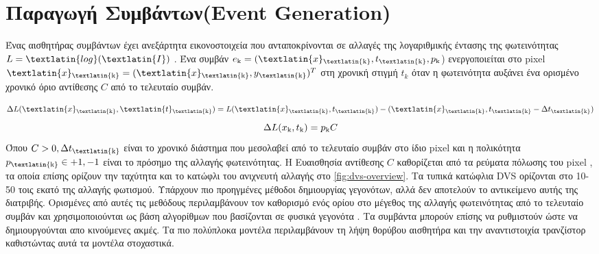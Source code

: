 \documentclass[12pt]{report}
\begin{document}
\section{Παραγωγή Συμβάντων(\textlatin{Event Generation})}

Ένας αισθητήρας συμβάντων \cite{Lichtsteiner2008} έχει ανεξάρτητα εικονοστοιχεία που ανταποκρίνονται
σε αλλαγές της λογαριθμικής έντασης της φωτεινότητας $L=\textlatin{log}(\textlatin{I})$ . Ένα συμβάν $e\textsubscript{k}=(\textlatin{x}\textsubscript{\textlatin{k}},t\textsubscript{\textlatin{k}},p\textsubscript{k}$) ενεργοποιείται στο \textlatin{pixel} $\textlatin{x}\textsubscript{\textlatin{k}}=(\textlatin{x}\textsubscript{\textlatin{k}},y\textsubscript{\textlatin{k}})^T$ στη χρονική στιγμή $t_k$ όταν η φωτεινότητα αυξάνει ένα ορισμένο χρονικό όριο αντίθεσης $C$ από το τελευταίο συμβάν.

\begin{equation}
    \Delta L(\textlatin{x}\textsubscript{\textlatin{k}},\textlatin{t}\textsubscript{\textlatin{k}}) = L(\textlatin{x}\textsubscript{\textlatin{k}},t\textsubscript{\textlatin{k}})-(\textlatin{x}\textsubscript{\textlatin{k}},t\textsubscript{\textlatin{k}}-\Delta t\textsubscript{\textlatin{k}})
\end{equation}
\begin{equation}
   \Delta L(x\textsubscript{k},t\textsubscript{k}) = p\textsubscript{k}C 
\end{equation}
Όπου \(C > 0, \Delta t\textsubscript{\textlatin{k}}\) είναι το χρονικό διάστημα που μεσολαβεί από το τελευταίο συμβάν στο ίδιο \textlatin{pixel} και η πολικότητα \(p\textsubscript{\textlatin{k}} \in {+1,-1}\) είναι το πρόσημο της αλλαγής φωτεινότητας\cite{Lichtsteiner2008}. Η Ευαισθησία αντίθεσης $C$ καθορίζεται από τα ρεύματα πόλωσης του \textlatin{pixel} \cite{nozaki2017} \cite{Gallego2020}, τα οποία επίσης ορίζουν την ταχύτητα και το κατώφλι του ανιχνευτή αλλαγής στο \ref{fig:dvs-overview}. Τα τυπικά κατώφλια \textlatin{DVS} ορίζονται στο 10-50 τοις εκατό της αλλαγής φωτισμού. Υπάρχουν πιο προηγμένες μέθοδοι δημιουργίας γεγονότων, αλλά δεν αποτελούν το αντικείμενο αυτής της διατριβής. Ορισμένες από αυτές τις μεθόδους περιλαμβάνουν τον καθορισμό ενός ορίου στο μέγεθος της αλλαγής φωτεινότητας από το τελευταίο συμβάν και χρησιμοποιούνται ως βάση αλγορίθμων που βασίζονται σε φυσικά γεγονότα \cite{Gallego2019}. Τα συμβάντα μπορούν επίσης να ρυθμιστούν ώστε να δημιουργούνται απο κινούμενες ακμές. Τα πιο πολύπλοκα μοντέλα περιλαμβάνουν τη λήψη θορύβου αισθητήρα και την αναντιστοιχία τρανζίστορ καθιστώντας αυτά τα μοντέλα στοχαστικά.
\end{document}
